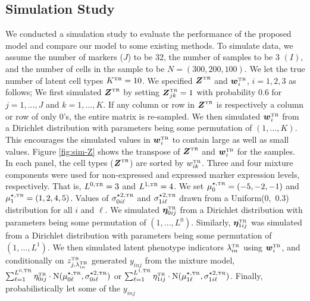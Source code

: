 \documentclass[12pt,]{article}
\newcommand{\N}{ \mathcal{N} }
\def\bet{\bm{\eta}}
\def\N{\text{N}}
\newcommand{\true}{{\mbox{\tiny TR}}}
\newcommand{\bZ}{\mbox{\boldmath $Z$}}
\newcommand{\bw}{\mbox{\boldmath $w$}}
\begin{document}
\subsection{Simulation Study}\label{sec:CB-sim} %
We conducted a simulation study to evaluate the performance of the proposed
model and compare our model to some existing methods.
To simulate data, we assume the number of markers ($J$) to be 32, 
the number of samples to be 3 $(I)$, and the number of cells in the sample to
be $N=(300, 200, 100)$.  We let the true number of latent cell types
$K^\true=10$.  We specified $\bZ^\true$ and $\bw^\true_i$, $i=1,2,3$ as
follows; We first simulated $\bZ^\true$ by setting $\bZ^\true_{jk}=1$ with
probability 0.6 for $j=1,...,J$ and $k=1,...,K$. If any column or row in
$\bZ^\true$ is respectively a column or row of only 0's, the entire matrix is
re-sampled.
We then simulated $\bw^\true_i$ from a Dirichlet distribution with parameters
being some permutation of $(1, \ldots,K)$. This encourages the simulated values
in $\bw^\true_i$ to contain large as well as small values.
%
Figure \ref{fig:sim-Z} shows the transpose of $\bZ^\true$ and $\bw^\true_i$ for
the samples. In each panel, the cell types ($\bZ^\true$) are sorted by
$w_{ik}^\true$.  Three and four mixture components were used for non-expressed
and expressed marker expression levels, respectively. That is, $L^{0, \true}=3$
and $L^{1, \true}=4$. We set  $\mu^{\star, \true}_{0} = (-5, -2, -1)$ and
$\mu^{\star, \true}_{1} = (1, 2, 4, 5)$. Values of $\sigma^{\star 2,
\true}_{0i\ell}$ and $\sigma^{\star 2,\true}_{1i\ell}$ drawn 
from a Uniform(0,~0.3) distribution for all $i$ and $\ell$.
%
We simulated $\bet_{0ij}^\true$ from a Dirichlet distribution with
parameters being some permutation of $(1,...,L^0)$. Similarly, 
$\bet_{1ij}^\true$ was simulated from a Dirichlet distribution with
parameters being some permutation of $(1,...,L^1)$.
%
We then simulated latent phenotype indicators $\lambda_{in}^\true$ using
$\bw_i^\true$, and conditionally on $z^\true_{j,\lambda_{in}^\true}$ generated
$y_{inj}$ from the mixture model, $\sum_{\ell=1}^{L^{0,\true}}
\eta^\true_{0ij}\cdot\N(\mu^{\star, \true}_{0\ell}, \sigma^{\star 2,
\true}_{0i\ell})$ or $\sum_{\ell=1}^{L^{1,\true}}
\eta^\true_{1ij}\cdot\N(\mu^{\star, \true}_{1\ell}, \sigma^{\star 2,
\true}_{1i\ell})$.   Finally, probabilistically let some of the $y_{inj}$
\end{document}
